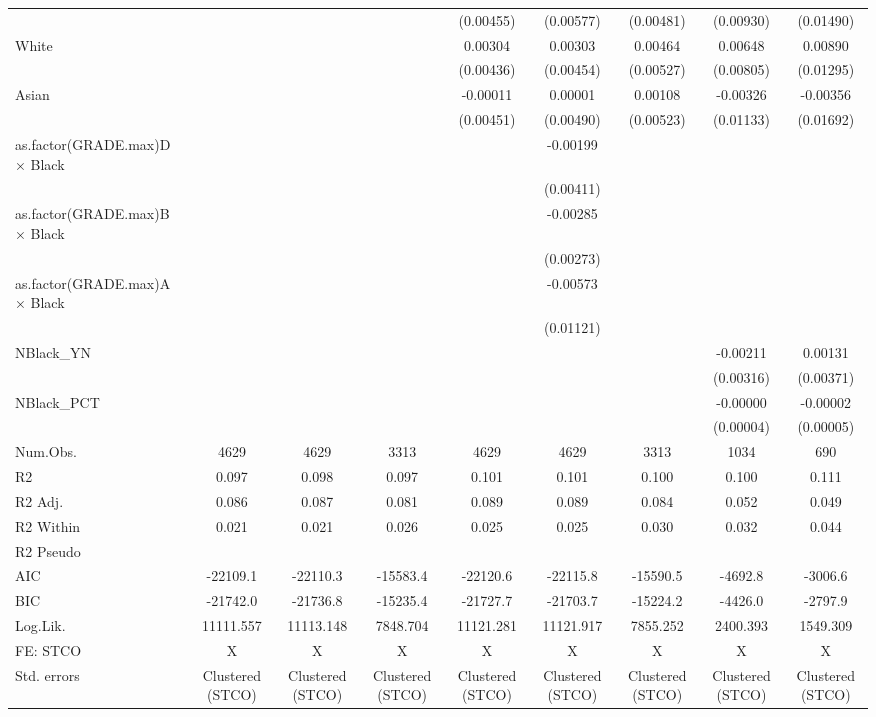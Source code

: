 \documentclass[
]{article}
\begin{document}
\begin{table}
{\begin{tabular}[t]{lcccccccc}
 &  &  &  & (0.00455) & (0.00577) & (0.00481) & (0.00930) & (0.01490)\\
White &  &  &  & 0.00304 & 0.00303 & 0.00464 & 0.00648 & 0.00890\\
 &  &  &  & (0.00436) & (0.00454) & (0.00527) & (0.00805) & (0.01295)\\
Asian &  &  &  & -0.00011 & 0.00001 & 0.00108 & -0.00326 & -0.00356\\
 &  &  &  & (0.00451) & (0.00490) & (0.00523) & (0.01133) & (0.01692)\\
as.factor(GRADE.max)D × Black &  &  &  &  & -0.00199 &  &  & \\
 &  &  &  &  & (0.00411) &  &  & \\
as.factor(GRADE.max)B × Black &  &  &  &  & -0.00285 &  &  & \\
 &  &  &  &  & (0.00273) &  &  & \\
as.factor(GRADE.max)A × Black &  &  &  &  & -0.00573 &  &  & \\
 &  &  &  &  & (0.01121) &  &  & \\
NBlack\_YN &  &  &  &  &  &  & -0.00211 & 0.00131\\
 &  &  &  &  &  &  & (0.00316) & (0.00371)\\
NBlack\_PCT &  &  &  &  &  &  & -0.00000 & -0.00002\\
 &  &  &  &  &  &  & (0.00004) & (0.00005)\\
\midrule
Num.Obs. & 4629 & 4629 & 3313 & 4629 & 4629 & 3313 & 1034 & 690\\
R2 & 0.097 & 0.098 & 0.097 & 0.101 & 0.101 & 0.100 & 0.100 & 0.111\\
R2 Adj. & 0.086 & 0.087 & 0.081 & 0.089 & 0.089 & 0.084 & 0.052 & 0.049\\
R2 Within & 0.021 & 0.021 & 0.026 & 0.025 & 0.025 & 0.030 & 0.032 & 0.044\\
R2 Pseudo &  &  &  &  &  &  &  & \\
AIC & -22109.1 & -22110.3 & -15583.4 & -22120.6 & -22115.8 & -15590.5 & -4692.8 & -3006.6\\
BIC & -21742.0 & -21736.8 & -15235.4 & -21727.7 & -21703.7 & -15224.2 & -4426.0 & -2797.9\\
Log.Lik. & 11111.557 & 11113.148 & 7848.704 & 11121.281 & 11121.917 & 7855.252 & 2400.393 & 1549.309\\
FE: STCO & X & X & X & X & X & X & X & X\\
Std. errors & Clustered (STCO) & Clustered (STCO) & Clustered (STCO) & Clustered (STCO) & Clustered (STCO) & Clustered (STCO) & Clustered (STCO) & Clustered (STCO)\\

\end{tabular}}
\end{table}
\end{document}
